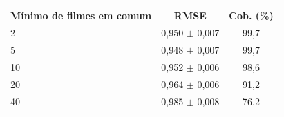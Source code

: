 \begin{tabular}{lcc}
\hline
M\'inimo de filmes em comum & RMSE & Cob. (\%) \\
\hline
2 & 0,950 $\pm$ 0,007 & 99,7 \\
5 & 0,948 $\pm$ 0,007 & 99,7 \\
10 & 0,952 $\pm$ 0,006 & 98,6 \\
20 & 0,964 $\pm$ 0,006 & 91,2 \\
40 & 0,985 $\pm$ 0,008 & 76,2 \\
\hline
\end{tabular}
